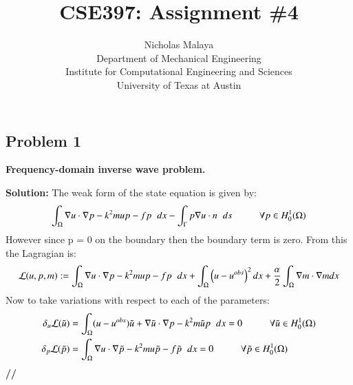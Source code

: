 \documentclass[11pt]{article}
\newenvironment{solution}{\begin{trivlist}\item[]{\bf Solution:}}
                      {\textbf{//} \end{trivlist}}
\begin{document}
\title{\bf{CSE397: Assignment \#4}}
\author{Nicholas Malaya \\ Department of Mechanical Engineering \\
Institute for Computational Engineering and Sciences \\ University of
Texas at Austin} \date{} 
\maketitle
\newpage

\subsection*{ Problem 1}
\textbf{Frequency-domain inverse wave problem.} 

\begin{enumerate}
\item[(a)]
\begin{solution}
The weak form of the state equation is given by: 
\begin{displaymath}
\int_{\Omega}\nabla u \cdot \nabla p - k^2mup - fp\hspace{2 mm}dx -
 \int_{\Gamma}p\nabla u \cdot n\hspace{2 mm}ds \hspace{1 cm} \forall p
 \in H^1_0(\Omega) 
\end{displaymath}
However since p = 0 on the boundary then the boundary term is zero. From
 this the Lagragian is: 
\begin{displaymath}
\mathcal{L}(u,p,m) := \int_{\Omega}\nabla u \cdot \nabla p - k^2mup -
 fp\hspace{2 mm}dx + \int_{\Omega}\left(u - u^{obs}\right)^2 dx +
 \frac{\alpha}{2}\int_{\Omega}\nabla m \cdot \nabla m dx 
\end{displaymath}
Now to take variations with respect to each of the parameters:
\begin{align}
\delta_u\mathcal{L}(\tilde{u}) &= \int_{\Omega}(u-u^{obs})\tilde{u} +
 \nabla\tilde{u}\cdot\nabla p - k^2m\tilde{u}p \hspace{2 mm} dx = 0
 \hspace{1 cm} \forall\tilde{u} \in H^1_0(\Omega) \nonumber \\ 
\delta_p\mathcal{L}(\tilde{p}) &= \int_{\Omega} \nabla u \cdot
 \nabla\tilde{p} - k^2mu\tilde{p} - f\tilde{p} \hspace{2 mm} dx = 0
 \hspace{1 cm} \forall\tilde{p} \in H^1_0(\Omega) \nonumber \\ 

\end{align}
\end{solution}
\end{enumerate}
\end{document}
